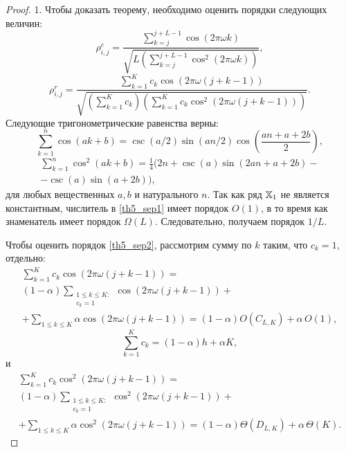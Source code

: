 \documentclass[12pt, specialist, subf,href,colorlinks=true,substylefile = spbu.rtx]{disser}
\theoremstyle{remark}
\theoremstyle{definition}
\begin{document}
\begin{proof}
	1. Чтобы доказать теорему, необходимо оценить порядки следующих величин:
	\begin{equation}\label{th5_sep1}
	\rho^c_{i,j} = \frac{\sum_{k=j}^{j + L - 1} \cos(2 \pi \omega k)}{\sqrt{L \left(\sum_{k=j}^{j + L - 1} \cos^2(2 \pi \omega k)\right)}},
	\end{equation}
	\begin{equation}\label{th5_sep2}
	\rho^r_{i,j} = \frac{\sum_{k=1}^K c_k\cos(2 \pi \omega (j + k - 1))}{\sqrt{\left(\sum_{k=1}^K c_k\right) \left(\sum_{k=1}^K c_k\cos^2(2 \pi \omega (j + k - 1))\right)}}.
	\end{equation}
	Следующие тригонометрические равенства верны:
	\begin{equation}
	\label{sumcos}
	\sum_{k=1}^n \cos(ak + b) = \csc(a/2) \sin(an / 2) \cos \left(\frac{an + a + 2b}{2} \right), 
	\end{equation}
	\begin{multline}
	\label{sumsqcos}
	\sum_{k=1}^n \cos^2(ak + b) = \frac{1}{4}(2n + \csc(a) \sin(2an + a + 2b) -\\ - \csc(a)\sin(a + 2b)),
	\end{multline}
	для любых вещественных $a, b$ и натурального $n$.
	Так как ряд $\mathbb{X}_1$ не является константным, числитель в \eqref{th5_sep1} имеет порядок $O(1)$, в то время как знаменатель имеет порядок $\Omega(L)$. Следовательно, получаем порядок $1/L$.
	
	Чтобы оценить порядок \eqref{th5_sep2}, рассмотрим сумму по $k$ таким, что $c_k=1$, отдельно:
	\begin{multline*}
	\sum_{k=1}^K c_k\cos(2 \pi \omega (j + k - 1)) = \\ (1-\alpha) \sum_{\substack{1 \le k \le K: \\ c_k = 1}}\cos(2 \pi \omega (j + k - 1)) +\\ +\sum_{1 \le k \le K}\alpha \cos(2 \pi \omega (j + k - 1)) = (1-\alpha)O(C_{L,K}) + \alpha\, O(1),
	\end{multline*}
	\begin{equation*}
	\sum_{k=1}^K c_k = (1-\alpha) h + \alpha K,
	\end{equation*}
	и
	\begin{multline*}
	\sum_{k=1}^K c_k\cos^2(2 \pi \omega (j + k - 1)) = \\ (1-\alpha)\sum_{\substack{1 \le k \le K: \\ c_k = 1}}\cos^2(2 \pi \omega (j + k - 1)) +\\ +\sum_{1 \le k \le K }\alpha \cos^2(2 \pi \omega (j + k - 1)) = (1-\alpha) \Theta(D_{L,K}) + \alpha\, \Theta(K).
	\end{multline*}
	

\end{proof}
\end{document}
